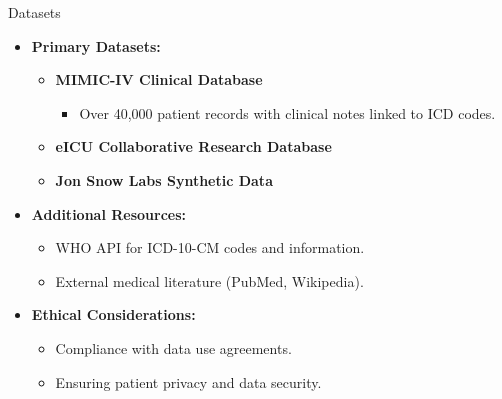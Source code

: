\documentclass{beamer}
\begin{document}
\begin{frame}{Datasets}
    \begin{itemize}
        \item \textbf{Primary Datasets:}
        \begin{itemize}
            \item \textbf{MIMIC-IV Clinical Database}
            \begin{itemize}
                \item Over 40,000 patient records with clinical notes linked to ICD codes.
            \end{itemize}
            \item \textbf{eICU Collaborative Research Database}
            \item \textbf{Jon Snow Labs Synthetic Data}
        \end{itemize}
        \item \textbf{Additional Resources:}
        \begin{itemize}
            \item WHO API for ICD-10-CM codes and information.
            \item External medical literature (PubMed, Wikipedia).
        \end{itemize}
        \item \textbf{Ethical Considerations:}
        \begin{itemize}
            \item Compliance with data use agreements.
            \item Ensuring patient privacy and data security.
        \end{itemize}
    \end{itemize}
\end{frame}
\end{document}
